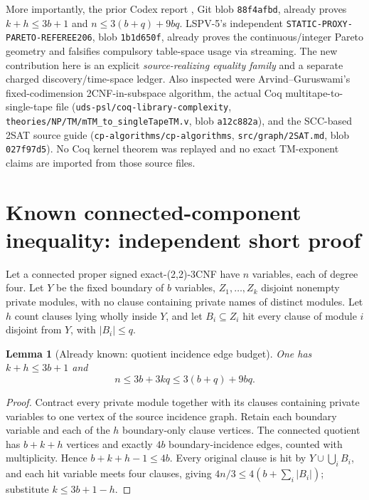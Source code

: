 \documentclass[11pt]{article}
\newtheorem{lemma}[theorem]{Lemma}
\begin{document}
More importantly, the prior Codex report , Git blob \texttt{88f4afbd}, already proves $k+h\le3b+1$ and $n\le3(b+q)+9bq$. LSPV-5's independent \texttt{STATIC-PROXY-PARETO-REFEREE206}, blob \texttt{1b1d650f}, already proves the continuous/integer Pareto geometry and falsifies compulsory table-space usage via streaming. The new contribution here is an explicit \emph{source-realizing equality family} and a separate charged discovery/time-space ledger. Also inspected were Arvind--Guruswami's fixed-codimension 2CNF-in-subspace algorithm, the actual Coq multitape-to-single-tape file (\texttt{uds-psl/coq-library-complexity}, \texttt{theories/NP/TM/mTM\_to\_singleTapeTM.v}, blob \texttt{a12c882a}), and the SCC-based 2SAT source guide (\texttt{cp-algorithms/cp-algorithms}, \texttt{src/graph/2SAT.md}, blob \texttt{027f97d5}). No Coq kernel theorem was replayed and no exact TM-exponent claims are imported from those source files.

\section{Known connected-component inequality: independent short proof}
Let a connected proper signed exact-(2,2)-3CNF have $n$ variables, each of degree four. Let $Y$ be the fixed boundary of $b$ variables, $Z_1,\ldots,Z_k$ disjoint nonempty private modules, with no clause containing private names of distinct modules. Let $h$ count clauses lying wholly inside $Y$, and let $B_i\subseteq Z_i$ hit every clause of module $i$ disjoint from $Y$, with $|B_i|\le q$.

\begin{lemma}[Already known: quotient incidence edge budget]\label{lem:known}
One has $k+h\le3b+1$ and
\[n\le3b+3kq\le3(b+q)+9bq.\]
\end{lemma}
\begin{proof}
Contract every private module together with its clauses containing private variables to one vertex of the source incidence graph. Retain each boundary variable and each of the $h$ boundary-only clause vertices. The connected quotient has $b+k+h$ vertices and exactly $4b$ boundary-incidence edges, counted with multiplicity. Hence $b+k+h-1\le4b$. Every original clause is hit by $Y\cup\bigcup_iB_i$, and each hit variable meets four clauses, giving $4n/3\le4(b+\sum_i|B_i|)$; substitute $k\le3b+1-h$.
\end{proof}
\end{document}
